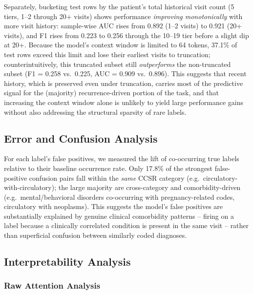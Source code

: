 \documentclass[11pt]{article}
\begin{document}
Separately, bucketing test rows by the patient's total historical visit
count (5 tiers, 1--2 through 20+ visits) shows performance
\emph{improving monotonically} with more visit history: sample-wise AUC rises
from 0.892 (1--2 visits) to 0.921 (20+ visits), and F1 rises from 0.223 to
0.256 through the 10--19 tier before a slight dip at 20+. Because the model's
context window is limited to 64 tokens, 37.1\% of test rows exceed this limit
and lose their earliest visits to truncation; counterintuitively, this
truncated subset still \emph{outperforms} the non-truncated subset (F1 = 0.258
vs.\ 0.225, AUC = 0.909 vs.\ 0.896). This suggests that recent history,
which is preserved even under truncation, carries most of the predictive
signal for the (majority) recurrence-driven portion of the task, and that
increasing the context window alone is unlikely to yield large performance
gains without also addressing the structural sparsity of rare labels.

\subsection{Error and Confusion Analysis}

For each label's false positives, we measured the lift of co-occurring true
labels relative to their baseline occurrence rate. Only 17.8\% of the
strongest false-positive confusion pairs fall within the \emph{same} CCSR
category (e.g.\ circulatory-with-circulatory); the large majority are
cross-category and comorbidity-driven (e.g.\ mental/behavioral disorders
co-occurring with pregnancy-related codes, circulatory with neoplasms). This
suggests the model's false positives are substantially explained by genuine
clinical comorbidity patterns -- firing on a label because a clinically
correlated condition is present in the same visit -- rather than superficial
confusion between similarly coded diagnoses.

\subsection{Interpretability Analysis}

\subsubsection{Raw Attention Analysis}
\end{document}
